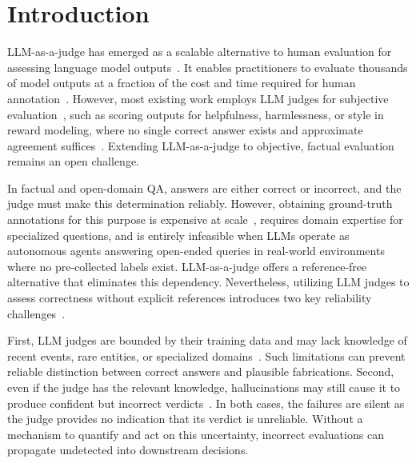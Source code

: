 \section{Introduction}
\label{sec:intro}
LLM-as-a-judge has emerged as a scalable alternative to human evaluation for assessing language model outputs~\citep{NEURIPS2023_91f18a12}. It enables practitioners to evaluate thousands of model outputs at a fraction of the cost and time required for human annotation~\citep{gu2024survey, tan2025judgebenchbench}. However, most existing work employs LLM judges for subjective evaluation~\citep{badshah-clev}, such as scoring outputs for helpfulness, harmlessness, or style in reward modeling, where no single correct answer exists and approximate agreement suffices~\citep{yuan-etal-2024-r, liu-etal-2023-g}. Extending LLM-as-a-judge to objective, factual evaluation remains an open challenge. 

In factual and open-domain QA, answers are either correct or incorrect, and the judge must make this determination reliably. However, obtaining ground-truth annotations for this purpose is expensive at scale~\citep{chianglee2023large, manas2024improving}, requires domain expertise for specialized questions, and is entirely infeasible when LLMs operate as autonomous agents answering open-ended queries in real-world environments where no pre-collected labels exist. LLM-as-a-judge offers a reference-free alternative that eliminates this dependency. Nevertheless, utilizing LLM judges to assess correctness without explicit references introduces two key reliability challenges~\citep{schroeder2025trustllm, badshah2025ref}.

First, LLM judges are bounded by their training data and may lack knowledge of recent events, rare entities, or specialized domains~\citep{10.1162/tacl_a_00754}. Such limitations can prevent reliable distinction between correct answers and plausible fabrications. Second, even if the judge has the relevant knowledge, hallucinations may still cause it to produce confident but incorrect verdicts~\citep{10.1145/3703155}. In both cases, the failures are silent as the judge provides no indication that its verdict is unreliable. Without a mechanism to quantify and act on this uncertainty, incorrect evaluations can propagate undetected into downstream decisions.

